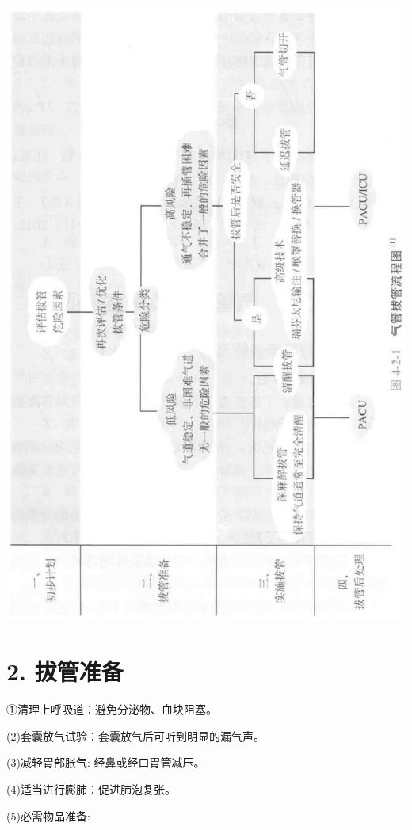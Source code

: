 \documentclass[10pt]{article}
\begin{document}
\begin{center}
\includegraphics[max width=\textwidth]{2024_07_05_645bb794a4d4f32ee0c8g-264}
\end{center}

\section*{2. 拔管准备}
①清理上呼吸道：避免分泌物、血块阻塞。

(2)套囊放气试验：套囊放气后可听到明显的漏气声。

(3)减轻胃部胀气: 经鼻或经口胃管减压。

(4)适当进行膨肺：促进肺泡复张。

(5)必需物品准备:
\end{document}
